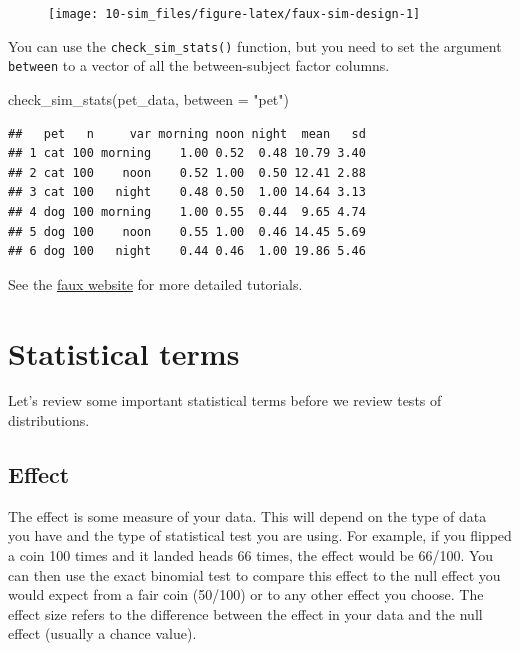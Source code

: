 \documentclass[
  oneside]{book}
\newenvironment{Shaded}{\begin{snugshade}}{\end{snugshade}}
\newcommand{\AttributeTok}[1]{\textcolor[rgb]{0.77,0.63,0.00}{#1}}
\newcommand{\FunctionTok}[1]{\textcolor[rgb]{0.00,0.00,0.00}{#1}}
\newcommand{\NormalTok}[1]{#1}
\newcommand{\StringTok}[1]{\textcolor[rgb]{0.31,0.60,0.02}{#1}}
\begin{document}
\begin{figure}

{\centering \texttt{[image: 10-sim\_files/figure-latex/faux-sim-design-1]} 

}

\end{figure}

You can use the \texttt{check\_sim\_stats()} function, but you need to set the argument \texttt{between} to a vector of all the between-subject factor columns.

\begin{Shaded}
\begin{Highlighting}[]
\FunctionTok{check\_sim\_stats}\NormalTok{(pet\_data, }\AttributeTok{between =} \StringTok{"pet"}\NormalTok{)}
\end{Highlighting}
\end{Shaded}

\begin{verbatim}
##   pet   n     var morning noon night  mean   sd
## 1 cat 100 morning    1.00 0.52  0.48 10.79 3.40
## 2 cat 100    noon    0.52 1.00  0.50 12.41 2.88
## 3 cat 100   night    0.48 0.50  1.00 14.64 3.13
## 4 dog 100 morning    1.00 0.55  0.44  9.65 4.74
## 5 dog 100    noon    0.55 1.00  0.46 14.45 5.69
## 6 dog 100   night    0.44 0.46  1.00 19.86 5.46
\end{verbatim}

See the \href{https://debruine.github.io/faux/}{faux website} for more detailed tutorials.

\hypertarget{stat-terms}{%
\section{Statistical terms}\label{stat-terms}}

Let's review some important statistical terms before we review tests of distributions.

\hypertarget{effect}{%
\subsection{Effect}\label{effect}}

The effect is some measure of your data. This will depend on the type of data you have and the type of statistical test you are using. For example, if you flipped a coin 100 times and it landed heads 66 times, the effect would be 66/100. You can then use the exact binomial test to compare this effect to the null effect you would expect from a fair coin (50/100) or to any other effect you choose. The effect size refers to the difference between the effect in your data and the null effect (usually a chance value).
\end{document}
